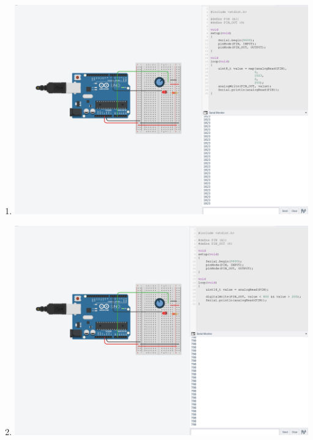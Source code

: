 \documentclass[a4paper,12pt]{article}
\begin{document}
\begin{enumerate}
{\begin{enumerate}[label=\alph*)]
    \end{enumerate}
    \item {
    \begin{enumerate}[label=\alph*)]
        \item {\includegraphics[width=\textwidth]{analog1}}
        \item {\includegraphics[width=\textwidth]{analog2}}
    \end{enumerate}
    }
    }
\end{enumerate}
\end{document}
